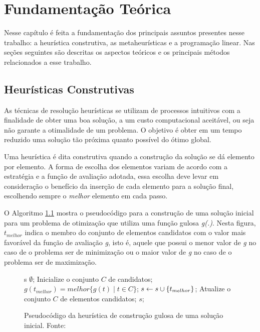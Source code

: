 \chapter{Fundamentação Teórica}

Nesse capítulo é feita a fundamentação dos principais assuntos presentes nesse
trabalho: a heurística construtiva, as metaheurísticas e a programação
linear. Nas seções seguintes são descritas os aspectos teóricos e os
principais métodos relacionados a esse trabalho.

\section{Heurísticas Construtivas}
As técnicas de resolução heurísticas se utilizam de processos intuitivos com a
finalidade de obter uma boa solução, a um custo computacional aceitável, ou
seja não garante a otimalidade de um problema. O objetivo é obter em um tempo
reduzido uma solução tão próxima quanto possível do ótimo global.
		
Uma heurística é dita construtiva quando a construção da solução se dá elemento
por elemento. A forma de escolha dos elementos variam de acordo com a
estratégia e a função de avaliação adotada, essa escolha deve levar em
consideração o benefício da inserção de cada elemento para a solução final,
escolhendo sempre o \emph{melhor} elemento em cada passo.
		
O Algoritmo \ref{alg:heurconsgulosa} mostra o pseudocódigo para a construção de
uma solução inicial para um problema de otimização que utiliza uma função
gulosa \emph{g(.)}. Nesta figura, \emph{$t_{melhor}$} indica o membro do
conjunto de elementos candidatos com o valor mais favorável da função de
avaliação \emph{g}, isto é, aquele que possui o menor valor de \emph{g} no caso
de o problema ser de minimização ou o maior valor de \emph{g} no caso de o
problema ser de maximização.


\begin{figure}[h]
\caption{Pseudocódigo da heurística de construção gulosa de uma solução
inicial. \newline \mbox{Fonte:
\cite{notasmarcone}} }\label{alg:heurconsgulosa}
\begin{programma}
\STATE s \GETS $\emptyset$;
\STATE Inicialize o conjunto $C$ de candidatos;
\STATE $g(t_{melhor}) = melhor\{g(t) \mid t \in C\}$;
\STATE $s \leftarrow s \cup \{t_{melhor}\}$;
\STATE Atualize o conjunto $C$ de elementos candidatos;
\ENDWHILE
\STATE\RETURN $s$;
\ENDALGORITHM
\end{programma}
\end{figure}		
		

